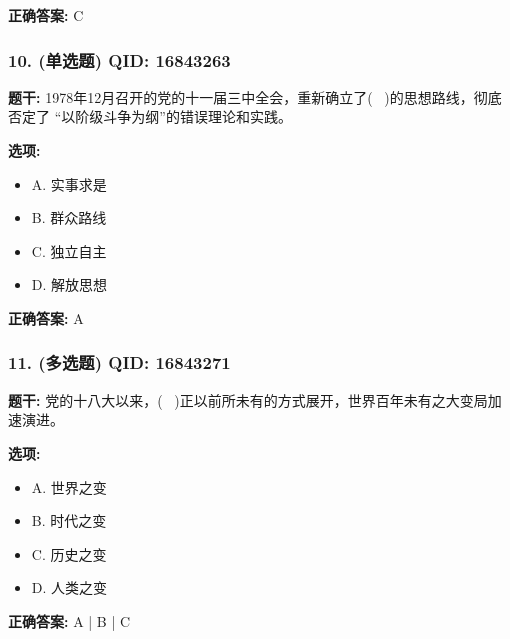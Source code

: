 \documentclass[12pt,UTF8]{ctexart}
\begin{document}
\textbf{正确答案:}
C

\vspace{0.3em}\hrulefill\vspace{0.7em}

\subsubsection*{10. (单选题) \small QID: 16843263}

\textbf{题干:}
1978年12月召开的党的十一届三中全会，重新确立了(  )的思想路线，彻底否定了 “以阶级斗争为纲”的错误理论和实践。

\textbf{选项:}
\begin{itemize}[leftmargin=*]

  \item A. 实事求是

  \item B. 群众路线

  \item C. 独立自主

  \item D. 解放思想

\end{itemize}

\textbf{正确答案:}
A

\vspace{0.3em}\hrulefill\vspace{0.7em}

\subsubsection*{11. (多选题) \small QID: 16843271}

\textbf{题干:}
党的十八大以来，(  )正以前所未有的方式展开，世界百年未有之大变局加速演进。

\textbf{选项:}
\begin{itemize}[leftmargin=*]

  \item A. 世界之变

  \item B. 时代之变

  \item C. 历史之变

  \item D. 人类之变

\end{itemize}

\textbf{正确答案:}
A | B | C

\vspace{0.3em}\hrulefill\vspace{0.7em}
\end{document}
